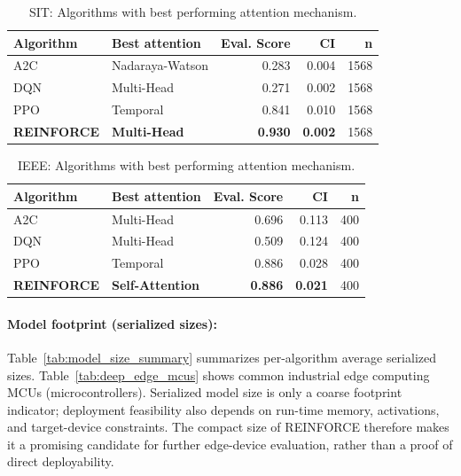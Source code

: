 \documentclass[sn-basic]{sn-jnl} %
\begin{document}
\begin{table}
	\caption{SIT: Algorithms with best performing attention mechanism.}
	\label{tab:sit_best_attn}
	\begin{tabular}{l l r r r}
	\toprule
	\textbf{Algorithm} & \textbf{Best attention} & \textbf{Eval. Score} & \textbf{CI} & \textbf{n}\\
	\midrule
		A2C & Nadaraya-Watson & 0.283 & 0.004 & 1568 \\
		DQN & Multi-Head & 0.271 & 0.002 & 1568 \\
		PPO & Temporal & 0.841 & 0.010 & 1568 \\
		\textbf{REINFORCE} & \textbf{Multi-Head} & \textbf{0.930} & \textbf{0.002} & 1568 \\
	\bottomrule
	\end{tabular}
\end{table}

\begin{table}[htbp]
	\centering
	\caption{IEEE: Algorithms with best performing attention mechanism.}
	\label{tab:ieee_best_attn}
	\begin{tabular}{l l r r r}
	\toprule
	\textbf{Algorithm} & \textbf{Best attention} & \textbf{Eval. Score} & \textbf{CI} & \textbf{n}\\
	\midrule
		A2C & Multi-Head & 0.696 & 0.113 & 400 \\
		DQN & Multi-Head & 0.509 & 0.124 & 400 \\
		PPO & Temporal & 0.886 & 0.028 & 400 \\
		\textbf{REINFORCE} & \textbf{Self-Attention} & \textbf{0.886} & \textbf{0.021} & 400 \\
	\bottomrule
	\end{tabular}
\end{table}

\paragraph{Model footprint (serialized sizes):} 
Table~\ref{tab:model_size_summary} summarizes per-algorithm average serialized sizes. Table~\ref{tab:deep_edge_mcus} shows common industrial edge computing MCUs (microcontrollers). Serialized model size is only a coarse footprint indicator; deployment feasibility also depends on run-time memory, activations, and target-device constraints. The compact size of \textsc{REINFORCE} therefore makes it a promising candidate for further edge-device evaluation, rather than a proof of direct deployability.
\end{document}
